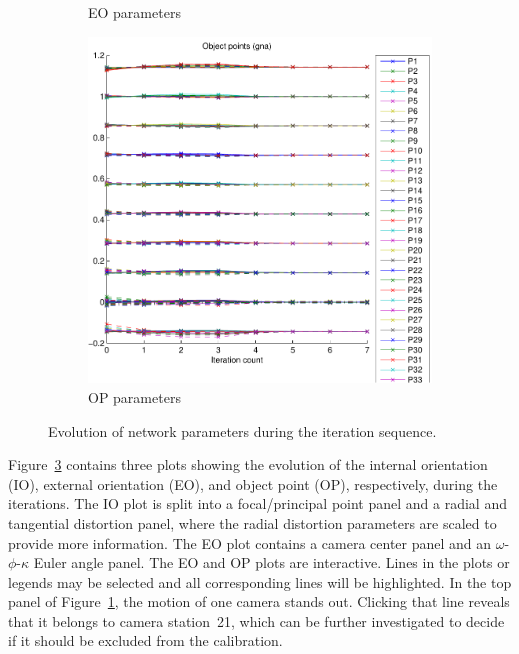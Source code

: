 \documentclass{article}
\begin{document}
\begin{figure}
\begin{subfigure}[b]{0.3\textwidth}
    \caption{EO parameters}
    \label{fig:EOtrace}
  \end{subfigure}
  \begin{subfigure}[b]{0.3\textwidth}
    \includegraphics[width=\textwidth]{ill/ccamoptrace}
    \caption{OP parameters}
    \label{fig:OPtrace}
  \end{subfigure}
  \caption{Evolution of network parameters during the iteration
    sequence.}\label{fig:netTrace}
\end{figure}

Figure~\ref{fig:netTrace} contains three plots showing the evolution
of the internal orientation (IO), external orientation (EO), and
object point (OP), respectively, during the iterations. The IO plot is
split into a focal/principal point panel and a radial and tangential
distortion panel, where the radial distortion parameters are scaled to
provide more information. The EO plot contains a camera center panel
and an $\omega$-$\phi$-$\kappa$ Euler angle panel. The EO and OP plots
are interactive. Lines in the plots or legends may be selected and all
corresponding lines will be highlighted. In the top panel of
Figure~\ref{fig:EOtrace}, the motion of one camera stands out.
Clicking that line reveals that it belongs to camera station~21, which
can be further investigated to decide if it should be excluded from
the calibration.
\end{document}
